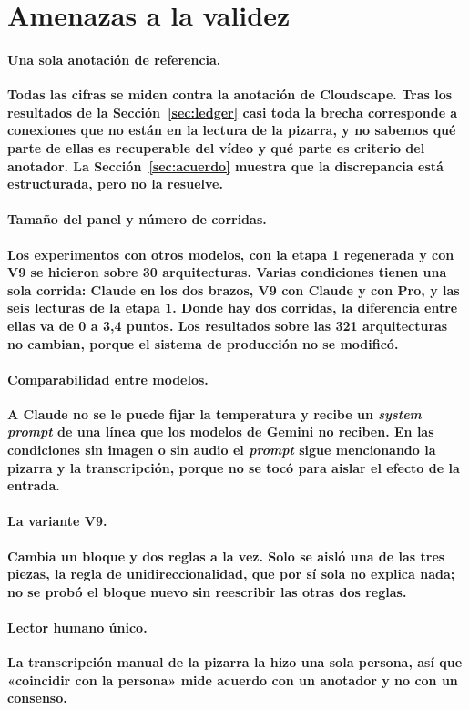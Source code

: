 \documentclass[a4paper, twocolumn, 10pt]{IEEEtran}
\newcommand{\nuevo}[1]{{\bfseries #1}}
\begin{document}
 
 
\section{\nuevo{Amenazas a la validez}}

\paragraph{\nuevo{Una sola anotación de referencia.}} \nuevo{Todas las cifras se miden contra
la anotación de Cloudscape. Tras los resultados de la Sección~\ref{sec:ledger} casi
toda la brecha corresponde a conexiones que no están en la lectura de la pizarra, y no
sabemos qué parte de ellas es recuperable del vídeo y qué parte es criterio del
anotador. La Sección~\ref{sec:acuerdo} muestra que la discrepancia está estructurada,
pero no la resuelve.}

\paragraph{\nuevo{Tamaño del panel y número de corridas.}} \nuevo{Los experimentos con otros
modelos, con la etapa 1 regenerada y con V9 se hicieron sobre 30 arquitecturas. Varias
condiciones tienen una sola corrida: Claude en los dos brazos, V9 con Claude y con Pro,
y las seis lecturas de la etapa 1. Donde hay dos corridas, la diferencia entre ellas
va de 0 a 3,4 puntos. Los resultados sobre las 321 arquitecturas no cambian, porque el
sistema de producción no se modificó.}

\paragraph{\nuevo{Comparabilidad entre modelos.}} \nuevo{A Claude no se le puede fijar la
temperatura y recibe un \emph{system prompt} de una línea que los modelos de Gemini no
reciben. En las condiciones sin imagen o sin audio el \emph{prompt} sigue mencionando
la pizarra y la transcripción, porque no se tocó para aislar el efecto de la entrada.}

\paragraph{\nuevo{La variante V9.}} \nuevo{Cambia un bloque y dos reglas a la vez. Solo se aisló
una de las tres piezas, la regla de unidireccionalidad, que por sí sola no explica
nada; no se probó el bloque nuevo sin reescribir las otras dos reglas.}

\paragraph{\nuevo{Lector humano único.}} \nuevo{La transcripción manual de la pizarra la hizo una
sola persona, así que «coincidir con la persona» mide acuerdo con un anotador y no con
un consenso.}
\end{document}
